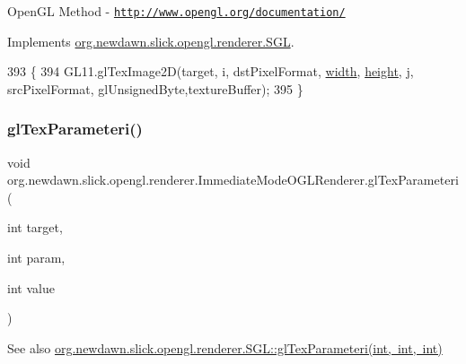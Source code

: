 Open\+GL Method -\/  \href{http://www.opengl.org/documentation/}{\tt http\+://www.\+opengl.\+org/documentation/} 

Implements \mbox{\hyperlink{interfaceorg_1_1newdawn_1_1slick_1_1opengl_1_1renderer_1_1_s_g_l_ac54bd1b95351cf7ed72830324f256e2e}{org.\+newdawn.\+slick.\+opengl.\+renderer.\+S\+GL}}.


\begin{DoxyCode}
393                                                           \{
394         GL11.glTexImage2D(target, i, dstPixelFormat, \mbox{\hyperlink{classorg_1_1newdawn_1_1slick_1_1opengl_1_1renderer_1_1_immediate_mode_o_g_l_renderer_a65d0a04d747368ea954f69074d9102d6}{width}}, \mbox{\hyperlink{classorg_1_1newdawn_1_1slick_1_1opengl_1_1renderer_1_1_immediate_mode_o_g_l_renderer_aec68994a0ee3b7b478122af823c8a8d7}{height}}, j, srcPixelFormat,
      glUnsignedByte,textureBuffer);                       
395     \}
\end{DoxyCode}
\mbox{\label{classorg_1_1newdawn_1_1slick_1_1opengl_1_1renderer_1_1_immediate_mode_o_g_l_renderer_a67bbcf08210460ee57b47e9d3e746248}} 
\subsubsection{\texorpdfstring{gl\+Tex\+Parameteri()}{glTexParameteri()}}
{\footnotesize\ttfamily void org.\+newdawn.\+slick.\+opengl.\+renderer.\+Immediate\+Mode\+O\+G\+L\+Renderer.\+gl\+Tex\+Parameteri (\begin{DoxyParamCaption}\item[{int}]{target,  }\item[{int}]{param,  }\item[{int}]{value }\end{DoxyParamCaption})\hspace{0.3cm}{\ttfamily [inline]}}

\begin{DoxySeeAlso}{See also}
\mbox{\hyperlink{interfaceorg_1_1newdawn_1_1slick_1_1opengl_1_1renderer_1_1_s_g_l_a99abf6a580aac95c599916a61a4933d4}{org.\+newdawn.\+slick.\+opengl.\+renderer.\+S\+G\+L\+::gl\+Tex\+Parameteri(int, int, int)}} 
\end{DoxySeeAlso}


